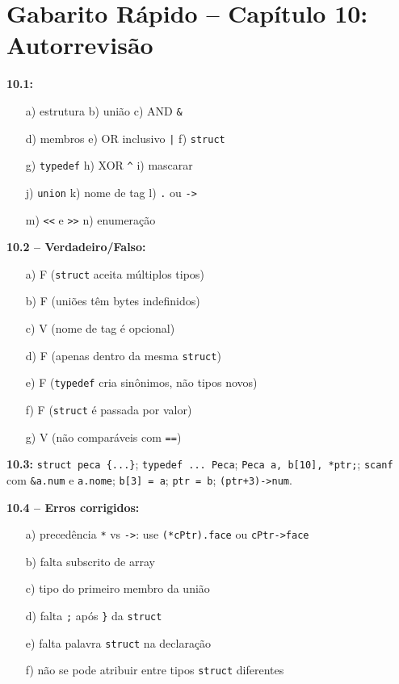 \documentclass[12pt,a4paper]{article}
\begin{document}
\newpage

\section*{Gabarito Rápido -- Capítulo 10: Autorrevisão}

\begin{tcolorbox}[colback=deitellightblue,colframe=deitelblue,title={\bfseries\large Respostas Resumidas}]

\textbf{10.1:}
\begin{itemize}[noitemsep]
  \item[a)] estrutura \quad b) união \quad c) AND \texttt{\&}
  \item[d)] membros \quad e) OR inclusivo \texttt{|} \quad f) \texttt{struct}
  \item[g)] \texttt{typedef} \quad h) XOR \texttt{\^{}} \quad i) mascarar
  \item[j)] \texttt{union} \quad k) nome de tag \quad l) \texttt{.} ou \texttt{->}
  \item[m)] \texttt{<<} e \texttt{>>} \quad n) enumeração
\end{itemize}

\medskip\textbf{10.2 -- Verdadeiro/Falso:}
\begin{itemize}[noitemsep]
  \item[a)] F (\texttt{struct} aceita múltiplos tipos)
  \item[b)] F (uniões têm bytes indefinidos)
  \item[c)] V (nome de tag é opcional)
  \item[d)] F (apenas dentro da mesma \texttt{struct})
  \item[e)] F (\texttt{typedef} cria sinônimos, não tipos novos)
  \item[f)] F (\texttt{struct} é passada por valor)
  \item[g)] V (não comparáveis com \texttt{==})
\end{itemize}

\medskip\textbf{10.3:} \texttt{struct peca \{...\}}; \texttt{typedef ... Peca};
\texttt{Peca a, b[10], *ptr;}; \texttt{scanf} com \texttt{\&a.num} e \texttt{a.nome};
\texttt{b[3] = a}; \texttt{ptr = b}; \texttt{(ptr+3)->num}.

\medskip\textbf{10.4 -- Erros corrigidos:}
\begin{itemize}[noitemsep]
  \item[a)] precedência \texttt{*} vs \texttt{->}: use \texttt{(*cPtr).face} ou \texttt{cPtr->face}
  \item[b)] falta subscrito de array
  \item[c)] tipo do primeiro membro da união
  \item[d)] falta \texttt{;} após \texttt{\}} da \texttt{struct}
  \item[e)] falta palavra \texttt{struct} na declaração
  \item[f)] não se pode atribuir entre tipos \texttt{struct} diferentes
\end{itemize}

\end{tcolorbox}
\end{document}
